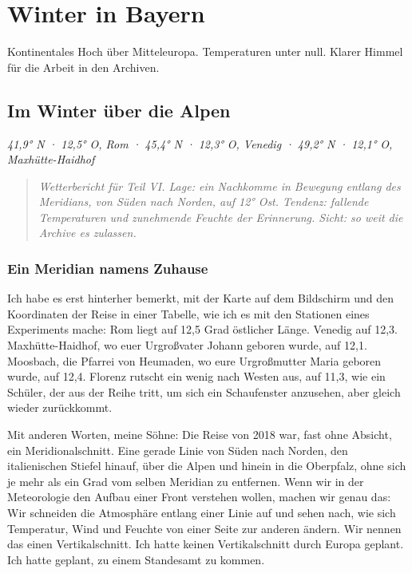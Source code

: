 \documentclass[
  ngerman,
  11pt,
  openany]{book}
\newenvironment{boletim}{\begin{center}\begin{minipage}{0.85\linewidth}\small\itshape}{\end{minipage}\end{center}}
\begin{document}
\part{Winter in Bayern}\label{winter-in-bayern}

\begin{boletim}

Kontinentales Hoch über Mitteleuropa. Temperaturen unter null. Klarer
Himmel für die Arbeit in den Archiven.

\end{boletim}

\chapter{Im Winter über die Alpen}\label{cap-16}

\emph{41,9° N · 12,5° O, Rom · 45,4° N · 12,3° O, Venedig · 49,2° N ·
12,1° O, Maxhütte-Haidhof}

\begin{quote}
\emph{Wetterbericht für Teil VI. Lage: ein Nachkomme in Bewegung entlang
des Meridians, von Süden nach Norden, auf 12° Ost. Tendenz: fallende
Temperaturen und zunehmende Feuchte der Erinnerung. Sicht: so weit die
Archive es zulassen.}
\end{quote}

\section{Ein Meridian namens Zuhause}\label{ein-meridian-namens-zuhause}

Ich habe es erst hinterher bemerkt, mit der Karte auf dem Bildschirm und
den Koordinaten der Reise in einer Tabelle, wie ich es mit den Stationen
eines Experiments mache: Rom liegt auf 12,5 Grad östlicher Länge.
Venedig auf 12,3. Maxhütte-Haidhof, wo euer Urgroßvater Johann geboren
wurde, auf 12,1. Moosbach, die Pfarrei von Heumaden, wo eure
Urgroßmutter Maria geboren wurde, auf 12,4. Florenz rutscht ein wenig
nach Westen aus, auf 11,3, wie ein Schüler, der aus der Reihe tritt, um
sich ein Schaufenster anzusehen, aber gleich wieder zurückkommt.

Mit anderen Worten, meine Söhne: Die Reise von 2018 war, fast ohne
Absicht, ein Meridionalschnitt. Eine gerade Linie von Süden nach Norden,
den italienischen Stiefel hinauf, über die Alpen und hinein in die
Oberpfalz, ohne sich je mehr als ein Grad vom selben Meridian zu
entfernen. Wenn wir in der Meteorologie den Aufbau einer Front verstehen
wollen, machen wir genau das: Wir schneiden die Atmosphäre entlang einer
Linie auf und sehen nach, wie sich Temperatur, Wind und Feuchte von
einer Seite zur anderen ändern. Wir nennen das einen Vertikalschnitt.
Ich hatte keinen Vertikalschnitt durch Europa geplant. Ich hatte
geplant, zu einem Standesamt zu kommen.
\end{document}
